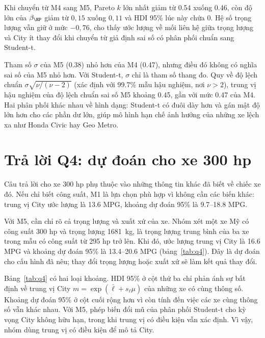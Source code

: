 \documentclass[12pt,a4paper]{report}
\begin{document}
Khi chuyển từ M4 sang M5, Pareto $k$ lớn nhất giảm từ
\num{0.54} xuống \num{0.46}, còn độ lớn của $\beta_{\HP}$ giảm từ $0{,}15$ xuống
$0{,}11$ và HDI 95\% lúc này chứa 0. Hệ số trọng lượng vẫn giữ ở mức $-0{,}76$,
cho thấy ước lượng về mối liên hệ giữa trọng lượng và City ít thay đổi khi
chuyển từ giả định sai số có phân phối chuẩn sang Student-t.

Tham số $\sigma$ của M5 (\num{0.38}) nhỏ hơn của M4 (\num{0.47}), nhưng điều đó không có
nghĩa sai số của M5 nhỏ hơn. Với Student-t, $\sigma$ chỉ là tham số thang đo.
Quy về độ lệch chuẩn $\sigma\sqrt{\nu/(\nu-2)}$ (xác định với \num{99.7}\% mẫu
hậu nghiệm, nơi $\nu > 2$), trung vị hậu nghiệm của độ lệch chuẩn sai số M5
khoảng \num{0.45}, gần với mức \num{0.47} của M4. Hai phân phối khác nhau
về hình dạng: Student-t có đuôi dày hơn và gán mật độ lớn hơn cho các phần dư
lớn, giúp mô hình hạn chế ảnh hưởng của những xe lệch xa như Honda Civic hay
Geo Metro.


\section{Trả lời Q4: dự đoán cho xe 300 hp}
\label{sec:q4}

Câu trả lời cho xe 300 hp phụ thuộc vào những thông tin khác đã biết về chiếc
xe đó. Nếu chỉ biết công suất, M1 là lựa chọn phù hợp vì không cần các biến
khác: trung vị City ước lượng là \num{13.6} MPG, khoảng dự đoán 95\% là
\num{9.7}--\num{18.8} MPG.

Với M5, cần chỉ rõ cả trọng lượng và xuất xứ của xe. Nhóm xét một xe Mỹ có
công suất 300 hp và trọng lượng \SI{1681}{kg}, là trọng lượng trung bình của
ba xe trong mẫu có công suất từ 295 hp trở lên. Khi đó, ước lượng trung vị
City là \num{16.6} MPG và khoảng dự đoán 95\% là \num{13.4}--\num{20.6} MPG
(bảng~\ref{tab:q4}). Đây là dự đoán cho cấu hình đã nêu; thay đổi trọng lượng
hoặc xuất xứ sẽ làm kết quả thay đổi.

Bảng~\ref{tab:q4} có hai loại khoảng. HDI 95\% ở cột thứ ba chỉ phản ánh sự
bất định về trung vị City $m = \exp(\bar{\ell} + s_\ell\mu)$ của những xe có
cùng thông số. Khoảng dự đoán 95\% ở cột cuối rộng hơn vì còn tính đến việc các
xe cùng thông số vẫn khác nhau. Với M5, phép biến đổi mũ của phân phối
Student-t cho kỳ vọng City không hữu hạn, trong khi trung vị có điều kiện vẫn
xác định. Vì vậy, nhóm dùng trung vị có điều kiện để mô tả City.
\end{document}
